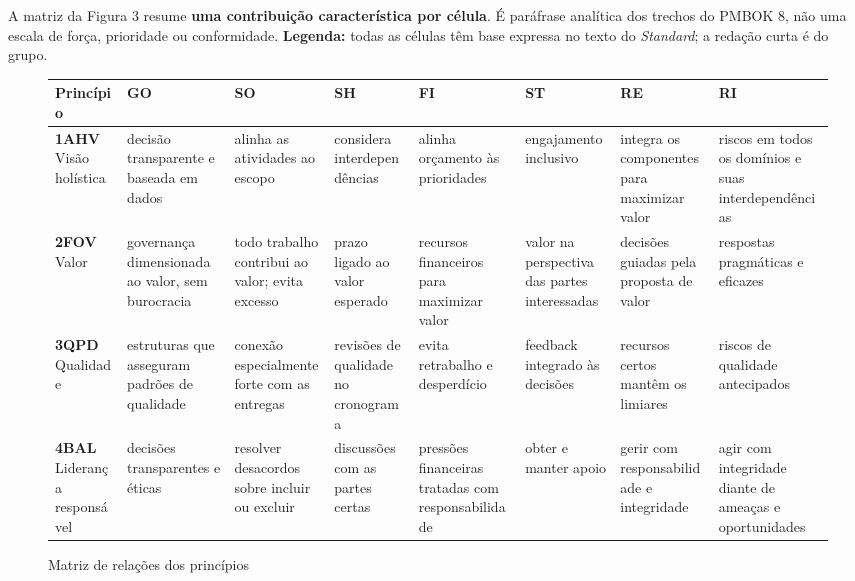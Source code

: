 \documentclass[12pt,a4paper,article,oneside,english,brazil]{abntex2}
\begin{document}
A matriz da Figura 3 resume \textbf{uma contribuição característica por célula}. É paráfrase analítica dos trechos do PMBOK 8, não uma escala de força, prioridade ou conformidade. \textbf{Legenda:} todas as células têm base expressa no texto do \textit{Standard}; a redação curta é do grupo.

\begin{figure}[!htbp]
\centering
\caption{Matriz de relações dos princípios}\label{fig:3}
\begingroup\SingleSpacing\scriptsize
\begin{tabular}{@{}>{\raggedright\arraybackslash}p{}>{\raggedright\arraybackslash}p{}>{\raggedright\arraybackslash}p{}>{\raggedright\arraybackslash}p{}>{\raggedright\arraybackslash}p{}>{\raggedright\arraybackslash}p{}>{\raggedright\arraybackslash}p{}>{\raggedright\arraybackslash}p{}@{}}
\hline
\textbf{Princípio} & \textbf{GO} & \textbf{SO} & \textbf{SH} & \textbf{FI} & \textbf{ST} & \textbf{RE} & \textbf{RI}\\
\hline
\rowcolor{bandaProativa}\textbf{1AHV} Visão holística & decisão transparente e baseada em dados & alinha as atividades ao escopo & considera interdependências & alinha orçamento às prioridades & engajamento inclusivo & integra os componentes para maximizar valor & riscos em todos os domínios e suas interdependências\\
\rowcolor{bandaValor}\textbf{2FOV} Valor & governança dimensionada ao valor, sem burocracia & todo trabalho contribui ao valor; evita excesso & prazo ligado ao valor esperado & recursos financeiros para maximizar valor & valor na perspectiva das partes interessadas & decisões guiadas pela proposta de valor & respostas pragmáticas e eficazes\\
\rowcolor{bandaProativa}\textbf{3QPD} Qualidade & estruturas que asseguram padrões de qualidade & conexão especialmente forte com as entregas & revisões de qualidade no cronograma & evita retrabalho e desperdício & feedback integrado às decisões & recursos certos mantêm os limiares & riscos de qualidade antecipados\\
\rowcolor{bandaResp}\textbf{4BAL} Liderança responsável & decisões transparentes e éticas & resolver desacordos sobre incluir ou excluir & discussões com as partes certas & pressões financeiras tratadas com responsabilidade & obter e manter apoio & gerir com responsabilidade e integridade & agir com integridade diante de ameaças e oportunidades\\

\end{tabular}
\end{figure}
\end{document}
